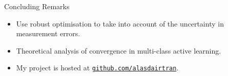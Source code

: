 \documentclass{beamer}
\begin{document}
\begin{frame}{Concluding Remarks}
	\begin{itemize}
		\item Use robust optimisation to take into account of the uncertainty in measurement
		errors.
		\item Theoretical analysis of convergence in multi-class active learning.
		\item My project is hosted at \href{https://github.com/alasdairtran/mclass-sky}{\texttt{github.com/alasdairtran}}.
	\end{itemize}
\end{frame}
\end{document}
